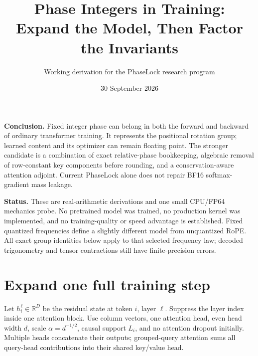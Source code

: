 \documentclass[11pt]{article}
\title{Phase Integers in Training:\\Expand the Model, Then Factor the Invariants}
\author{Working derivation for the PhaseLock research program}
\date{30 September 2026}
\newcommand{\RR}{\mathbb{R}}
\begin{document}
\maketitle

\textbf{Conclusion.} Fixed integer phase can belong in both the forward and backward of ordinary transformer training. It represents the positional rotation group; learned content and its optimizer can remain floating point. The stronger candidate is a combination of exact relative-phase bookkeeping, algebraic removal of row-constant key components before rounding, and a conservation-aware attention adjoint. Current PhaseLock alone does not repair BF16 softmax-gradient mass leakage.

\textbf{Status.} These are real-arithmetic derivations and one small CPU/FP64 mechanics probe. No pretrained model was trained, no production kernel was implemented, and no training-quality or speed advantage is established. Fixed quantized frequencies define a slightly different model from unquantized RoPE. All exact group identities below apply to that selected frequency law; decoded trigonometry and tensor contractions still have finite-precision errors.

\section{Expand one full training step}

Let $h_i^\ell\in\RR^D$ be the residual state at token $i$, layer $\ell$. Suppress the layer index inside one attention block. Use column vectors, one attention head, even head width $d$, scale $\alpha=d^{-1/2}$, causal support $L_i$, and no attention dropout initially. Multiple heads concatenate their outputs; grouped-query attention sums all query-head contributions into their shared key/value head.
\end{document}
